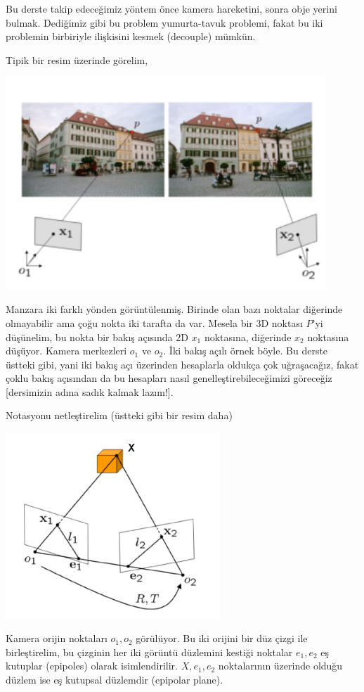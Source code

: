 \documentclass[12pt,fleqn]{article}\usepackage{../../common}
\begin{document}
Bu derste takip edeceğimiz yöntem önce kamera hareketini, sonra obje yerini
bulmak. Dediğimiz gibi bu problem yumurta-tavuk problemi, fakat bu iki problemin
birbiriyle ilişkisini kesmek (decouple) mümkün.

Tipik bir resim üzerinde görelim,

\includegraphics[height=8cm]{scene.png}

Manzara iki farklı yönden görüntülenmiş. Birinde olan bazı noktalar diğerinde
olmayabilir ama çoğu nokta iki tarafta da var. Mesela bir 3D noktası $P$'yi
düşünelim, bu nokta bir bakış açısında 2D $x_1$ noktasına, diğerinde $x_2$
noktasına düşüyor. Kamera merkezleri $o_1$ ve $o_2$. İki bakış açılı örnek
böyle. Bu derste üstteki gibi, yani iki bakış açı üzerinden hesaplarla oldukça
çok uğraşacağız, fakat çoklu bakış açısından da bu hesapları nasıl
genelleştirebileceğimizi göreceğiz [dersimizin adına sadık kalmak lazım!].

Notasyonu netleştirelim (üstteki gibi bir resim daha)

\includegraphics[height=7cm]{epi.png}

Kamera orijin noktaları $o_1,o_2$ görülüyor. Bu iki orijini bir düz çizgi ile
birleştirelim, bu çizginin her iki görüntü düzlemini kestiği noktalar $e_1,e_2$
eş kutuplar (epipoles) olarak isimlendirilir. $X,e_1,e_2$ noktalarının üzerinde
olduğu düzlem ise eş kutupsal düzlemdir (epipolar plane).
\end{document}
